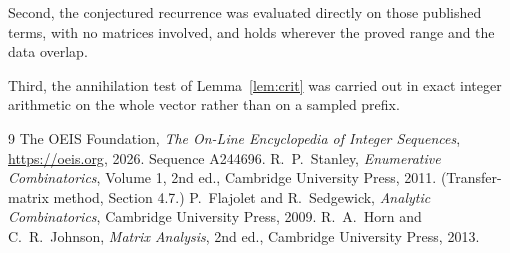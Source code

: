 \documentclass[11pt,a4paper]{article}
\theoremstyle{plain}
\theoremstyle{definition}
\begin{document}
Second, the conjectured recurrence was evaluated directly on those published terms, with no
matrices involved, and holds wherever the proved range and the data overlap.

Third, the annihilation test of Lemma~\ref{lem:crit} was carried out in exact integer
arithmetic on the whole vector rather than on a sampled prefix.

\begin{thebibliography}{9}
 The OEIS Foundation, \emph{The On-Line Encyclopedia of Integer
Sequences}, \url{https://oeis.org}, 2026. Sequence A244696.
 R.~P.~Stanley, \emph{Enumerative Combinatorics}, Volume 1, 2nd ed.,
Cambridge University Press, 2011. (Transfer-matrix method, Section 4.7.)
 P.~Flajolet and R.~Sedgewick, \emph{Analytic Combinatorics}, Cambridge
University Press, 2009.
 R.~A.~Horn and C.~R.~Johnson, \emph{Matrix Analysis}, 2nd ed., Cambridge
University Press, 2013.
\end{thebibliography}
\end{document}
